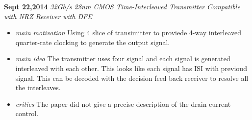 \documentclass[]{article}
\begin{document}
\noindent \textbf{Sept 22,2014}
\textit{32Gb/s 28nm CMOS Time-Interleaved Transmitter Compatible with NRZ Receiver with DFE}
\indent		\begin{itemize}
            \item \textit{main motivation} Using 4 slice of transimitter to proviede 4-way interleaved quarter-rate 
            clocking to generate the output signal.

            \item \textit{main idea} The transmitter uses four signal and each signal is generated interleaved with
            each other. This looks like each signal has ISI with previoud signal. This can be decoded with the decision
            feed back receiver to resolve all the interleaves.

            \item \textit{critics} The paper did not give a precise description of the drain current control.

        \end{itemize}
\end{document}
